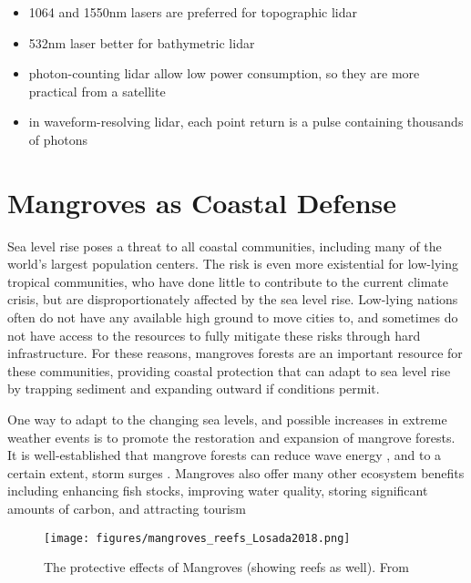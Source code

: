 \begin{itemize}
      \item 1064 and 1550nm lasers are preferred for topographic lidar
      \item 532nm laser better for bathymetric lidar
      \item photon-counting lidar allow low power consumption, so they are more practical from a satellite
      \item in waveform-resolving lidar, each point return is a pulse containing thousands of photons
\end{itemize}

\section{Mangroves as Coastal Defense}

Sea level rise poses a threat to all coastal communities, including many of the world's largest population centers. The risk is even more existential for low-lying tropical communities, who have done little to contribute to the current climate crisis, but are disproportionately affected by the sea level rise. Low-lying nations often do not have any available high ground to move cities to, and sometimes do not have access to the resources to fully mitigate these risks through hard infrastructure. For these reasons, mangroves forests are an important resource for these communities, providing coastal protection that can adapt to sea level rise by trapping sediment and expanding outward if conditions permit.

One way to adapt to the changing sea levels, and possible increases in extreme weather events is to promote the restoration and expansion of mangrove forests. It is well-established that mangrove forests can reduce wave energy \parencite{Maza2019,Menendez2020}, and to a certain extent, storm surges \parencite{Montgomery2019a,Chen2021,Mcivor2012}. Mangroves also offer many other ecosystem benefits including enhancing fish stocks, improving water quality, storing significant amounts of carbon, and attracting tourism \parencite{Atkinson2016b}

\begin{figure}[htbp]
      \centering
      \texttt{[image: figures/mangroves\_reefs\_Losada2018.png]}
      \caption{The protective effects of Mangroves (showing reefs as well). From \parencite{Losada2018}}
      \label{mangrove-protection-diagram}
\end{figure}

